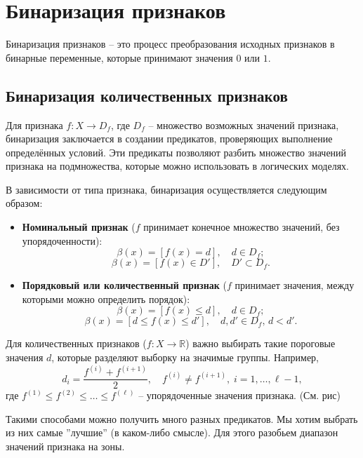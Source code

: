 \section{Бинаризация признаков}

Бинаризация признаков – это процесс преобразования исходных признаков в бинарные переменные, которые принимают значения \(0\) или \(1\). 

\subsection{Бинаризация количественных признаков}

Для признака \( f: X \to D_f \), где \( D_f \) – множество возможных значений признака, бинаризация заключается в создании предикатов, проверяющих выполнение определённых условий. Эти предикаты позволяют разбить множество значений признака на подмножества, которые можно использовать в логических моделях.

В зависимости от типа признака, бинаризация осуществляется следующим образом:
\begin{itemize}
    \item \textbf{Номинальный признак} (\(f\) принимает конечное множество значений, без упорядоченности):
    \[
    \beta(x) = [f(x) = d], \quad d \in D_f;
    \]
    \[
    \beta(x) = [f(x) \in D'], \quad D' \subset D_f.
    \]
    \item \textbf{Порядковый или количественный признак} (\(f\) принимает значения, между которыми можно определить порядок):
    \[
    \beta(x) = [f(x) \leq d], \quad d \in D_f;
    \]
    \[
    \beta(x) = [d \leq f(x) \leq d'], \quad d, d' \in D_f, \, d < d'.
    \]
\end{itemize}

Для количественных признаков (\(f: X \to \mathbb{R}\)) важно выбирать такие пороговые значения \(d\), которые разделяют выборку на значимые группы. Например, 
\[
d_i = \frac{f^{(i)} + f^{(i+1)}}{2}, \quad f^{(i)} \neq f^{(i+1)}, \; i = 1, \dots, \ell - 1,
\]
где \(f^{(1)} \leq f^{(2)} \leq \dots \leq f^{(\ell)}\) – упорядоченные значения признака. (См. рис)

Такими способами можно получить много разных предикатов. Мы хотим выбрать из них самые ''лучшие'' (в каком-либо смысле). Для этого разобьем диапазон значений признака на зоны.

